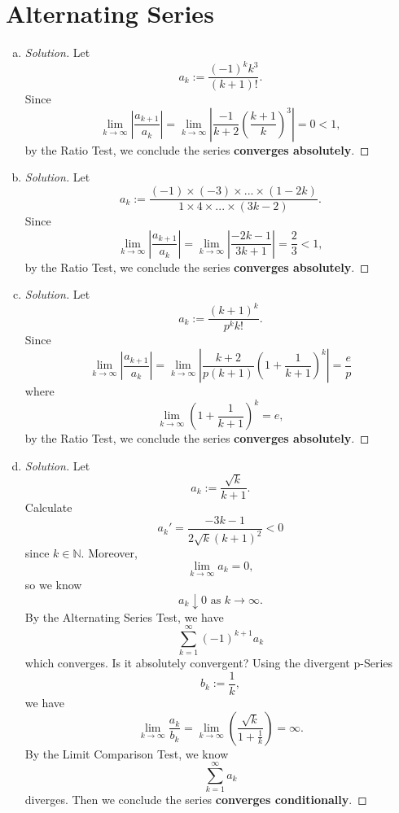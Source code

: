 \documentclass{report}
\newenvironment{solution}
  {\begin{proof}[Solution]}
  {\end{proof}}
\begin{document}
\section{Alternating Series}
\setcounter{Exercise}{2}
\begin{Exercise}
\begin{enumerate}[a)]
\item
\begin{solution}
Let $$a_k := \frac{(-1)^kk^3}{(k+1)!}.$$
Since $$\lim_{k\to\infty}\left|\frac{a_{k+1}}{a_k}\right| = \lim_{k\to\infty}\left|\frac{-1}{k+2}\left(\frac{k+1}{k}\right)^3\right| = 0 < 1,$$ by the Ratio Test, we conclude the series \textbf{converges absolutely}.
\end{solution}

\item
\begin{solution}
Let $$a_k := \frac{(-1)\times(-3)\times...\times(1-2k)}{1 \times 4 \times ... \times (3k-2)}.$$
Since $$\lim_{k\to\infty}\left|\frac{a_{k+1}}{a_k}\right| = \lim_{k\to\infty}\left|\frac{-2k-1}{3k+1}\right| = \frac{2}{3} < 1,$$ by the Ratio Test, we conclude the series \textbf{converges absolutely}.
\end{solution}

\item
\begin{solution}
Let $$a_k := \frac{\left( k+1 \right)^k}{p^k k!}.$$
Since $$\lim_{k\to\infty}\left|\frac{a_{k+1}}{a_k}\right| = \lim_{k\to\infty}\left|\frac{k+2}{p\left(k+1\right)}\left(1+\frac{1}{k+1}\right)^k\right| = \frac{e}{p}$$ where $$\lim_{k\to\infty}\left(1+\frac{1}{k+1}\right)^k = e,$$
by the Ratio Test, we conclude the series \textbf{converges absolutely}.
\end{solution}

\item
\begin{solution}
Let $$a_k := \frac{\sqrt{k}}{k+1}.$$
Calculate $$a_k' = \frac{-3k-1}{2\sqrt{k}\left(k+1\right)^2} < 0$$ since $k\in\mathbb{N}$. Moreover, $$\lim_{k\to\infty}a_k = 0,$$ so we know $$a_k\downarrow 0\text{ as }k\to\infty.$$ By the Alternating Series Test, we have $$\sum_{k=1}^{\infty}\left(-1\right)^{k+1}a_k$$ which converges.
Is it absolutely convergent? Using the divergent p-Series $$b_k := \frac{1}{k},$$ we have $$\lim_{k\to\infty}\frac{a_k}{b_k} = \lim_{k\to\infty}\left(\frac{\sqrt{k}}{1+\frac{1}{k}}\right) = \infty.$$ By the Limit Comparison Test, we know $$\sum_{k=1}^{\infty}a_k$$ diverges. Then we conclude the series \textbf{converges conditionally}.
\end{solution}


\end{enumerate}
\end{Exercise}
\end{document}
